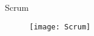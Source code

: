 \begin{frame}[t,noframenumbering]{Scrum}
\vspace{1cm}
\begin{figure}[h]
\centering
\texttt{[image: Scrum]}
\end{figure}
\end{frame}